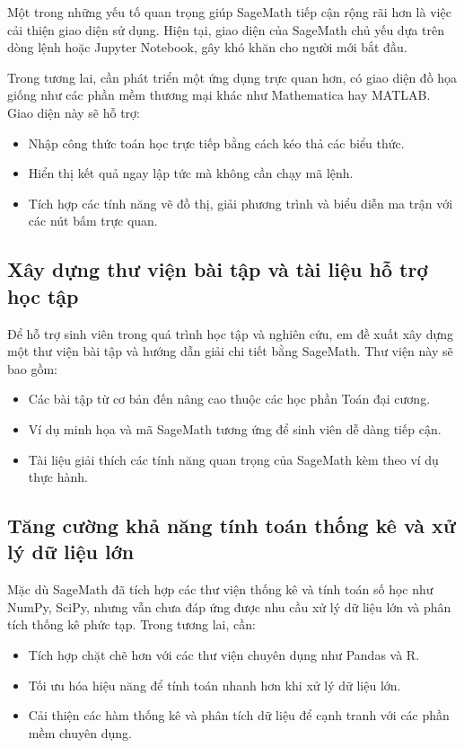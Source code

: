 Một trong những yếu tố quan trọng giúp SageMath tiếp cận rộng rãi hơn là việc cải thiện giao diện sử dụng. Hiện tại, giao diện của SageMath chủ yếu dựa trên dòng lệnh hoặc Jupyter Notebook, gây khó khăn cho người mới bắt đầu. 

Trong tương lai, cần phát triển một ứng dụng trực quan hơn, có giao diện đồ họa giống như các phần mềm thương mại khác như Mathematica hay MATLAB. Giao diện này sẽ hỗ trợ:
\begin{itemize}
	\item Nhập công thức toán học trực tiếp bằng cách kéo thả các biểu thức.
	\item Hiển thị kết quả ngay lập tức mà không cần chạy mã lệnh.
	\item Tích hợp các tính năng vẽ đồ thị, giải phương trình và biểu diễn ma trận với các nút bấm trực quan.
\end{itemize}

\subsection{Xây dựng thư viện bài tập và tài liệu hỗ trợ học tập}

Để hỗ trợ sinh viên trong quá trình học tập và nghiên cứu, em đề xuất xây dựng một thư viện bài tập và hướng dẫn giải chi tiết bằng SageMath. Thư viện này sẽ bao gồm:
\begin{itemize}
	\item Các bài tập từ cơ bản đến nâng cao thuộc các học phần Toán đại cương.
	\item Ví dụ minh họa và mã SageMath tương ứng để sinh viên dễ dàng tiếp cận.
	\item Tài liệu giải thích các tính năng quan trọng của SageMath kèm theo ví dụ thực hành.
\end{itemize}

\subsection{Tăng cường khả năng tính toán thống kê và xử lý dữ liệu lớn}

Mặc dù SageMath đã tích hợp các thư viện thống kê và tính toán số học như NumPy, SciPy, nhưng vẫn chưa đáp ứng được nhu cầu xử lý dữ liệu lớn và phân tích thống kê phức tạp. Trong tương lai, cần:
\begin{itemize}
	\item Tích hợp chặt chẽ hơn với các thư viện chuyên dụng như Pandas và R.
	\item Tối ưu hóa hiệu năng để tính toán nhanh hơn khi xử lý dữ liệu lớn.
	\item Cải thiện các hàm thống kê và phân tích dữ liệu để cạnh tranh với các phần mềm chuyên dụng.
\end{itemize}

